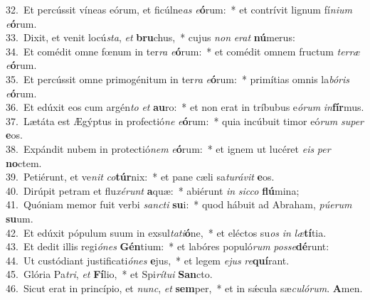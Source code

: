 {32.~}Et percússit víneas eórum, et ficúlne\textit{as} \textit{e}\textbf{ó}rum:~* et contrívit lignum fí\textit{ni}\textit{um} \textit{e}\textbf{ó}rum.\\
{33.~}Dixit, et venit locú\textit{sta}, \textit{et} \textbf{bru}chus,~* cujus \textit{non} \textit{e}\textit{rat} \textbf{nú}merus:\\
{34.~}Et comédit omne fœnum in ter\textit{ra} \textit{e}\textbf{ó}rum:~* et comédit omnem fructum \textit{ter}\textit{ræ} \textit{e}\textbf{ó}rum.\\
{35.~}Et percússit omne primogénitum in ter\textit{ra} \textit{e}\textbf{ó}rum:~* primítias omnis la\textit{bó}\textit{ris} \textit{e}\textbf{ó}rum.\\
{36.~}Et edúxit eos cum argén\textit{to} \textit{et} \textbf{au}ro:~* et non erat in tríbubus e\textit{ó}\textit{rum} \textit{in}\textbf{fír}mus.\\
{37.~}Lætáta est Ægýptus in profectió\textit{ne} \textit{e}\textbf{ó}rum:~* quia incúbuit timor eó\textit{rum} \textit{su}\textit{per} \textbf{e}os.\\
{38.~}Expándit nubem in protectió\textit{nem} \textit{e}\textbf{ó}rum:~* et ignem ut lucéret \textit{e}\textit{is} \textit{per} \textbf{no}ctem.\\
{39.~}Petiérunt, et ve\textit{nit} \textit{co}\textbf{túr}nix:~* et pane cæli sa\textit{tu}\textit{rá}\textit{vit} \textbf{e}os.\\
{40.~}Dirúpit petram et flu\textit{xé}\textit{runt} \textbf{a}quæ:~* abiérunt \textit{in} \textit{sic}\textit{co} \textbf{flú}mina;\\
{41.~}Quóniam memor fuit verbi \textit{san}\textit{cti} \textbf{su}i:~* quod hábuit ad Abraham, \textit{pú}\textit{e}\textit{rum} \textbf{su}um.\\
{42.~}Et edúxit pópulum suum in exsul\textit{ta}\textit{ti}\textbf{ó}ne,~* et eléctos su\textit{os} \textit{in} \textit{læ}\textbf{tí}tia.\\
{43.~}Et dedit illis regi\textit{ó}\textit{nes} \textbf{Gén}tium:~* et labóres populó\textit{rum} \textit{pos}\textit{se}\textbf{dé}runt:\\
{44.~}Ut custódiant justificati\textit{ó}\textit{nes} \textbf{e}jus,~* et legem \textit{e}\textit{jus} \textit{re}\textbf{quí}rant.\\
{45.~}Glória Pa\textit{tri}, \textit{et} \textbf{Fí}lio,~* et Spi\textit{rí}\textit{tu}\textit{i} \textbf{San}cto.\\
{46.~}Sicut erat in princípio, et \textit{nunc}, \textit{et} \textbf{sem}per,~* et in sǽcula sæ\textit{cu}\textit{ló}\textit{rum}. \textbf{A}men.\\
